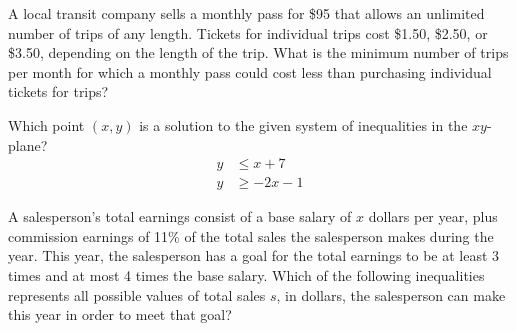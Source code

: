 \newpage
\noindent\markforreview

\vspace{1em}

A local transit company sells a monthly pass for \$95 that allows an unlimited number of trips of any length. Tickets for individual trips cost \$1.50, \$2.50, or \$3.50, depending on the length of the trip. What is the minimum number of trips per month for which a monthly pass could cost less than purchasing individual tickets for trips?



\vspace{5em}

\noindent\markforreview

\vspace{1em}

Which point \( (x, y) \) is a solution to the given system of inequalities in the \( xy \)-plane?
\[
\begin{aligned}
y &\leq x + 7 \\
y &\geq -2x - 1
\end{aligned}
\]

\vspace{0.75em}


\newpage
\noindent\markforreview

\vspace{1em}

A salesperson’s total earnings consist of a base salary of \( x \) dollars per year, plus commission earnings of 11\% of the total sales the salesperson makes during the year. This year, the salesperson has a goal for the total earnings to be at least 3 times and at most 4 times the base salary. Which of the following inequalities represents all possible values of total sales \( s \), in dollars, the salesperson can make this year in order to meet that goal?

\vspace{0.75em}


\vspace{2em}

\noindent\markforreview

\vspace{1em}

